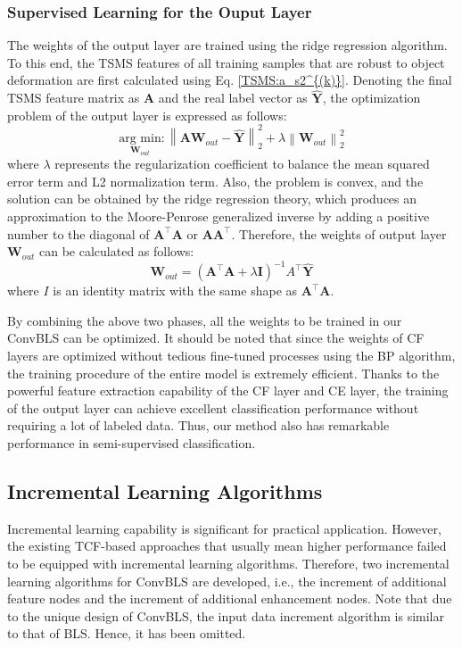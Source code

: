 \documentclass[lettersize,journal]{IEEEtran}
\begin{document}
\subsubsection{Supervised Learning for the Ouput Layer}
The weights of the output layer are trained using the ridge regression algorithm. To this end, the TSMS features of all training samples that are robust to object deformation are first calculated using Eq. \eqref{TSMS:a_s2^{(k)}}. Denoting the final TSMS feature matrix as $\bm{A}$ and the real label vector as $\hat{\bm{Y}}$, the optimization problem of the output layer is expressed as follows:
\begin{equation}
    \label{Problem_to_be_optimized}
    \underset {\bm{W}_{out}} {\text{arg min}}: \left \| \bm{AW}_{out} - \bm{\hat{Y}} \right \|_{2}^{2} + \lambda \left \| \bm{W}_{out} \right \|_{2}^{2} 
\end{equation}
where $\lambda$ represents the regularization coefficient to balance the mean squared error term and L2 normalization term. Also, the problem is convex, and the solution can be obtained by the ridge regression theory, which produces an approximation to the Moore-Penrose generalized inverse by adding a positive number to the diagonal of $\bm{A}^{\top}\bm{A}$ or $\bm{A}\bm{A}^{\top}$. Therefore, the weights of output layer $\bm{W}_{out}$ can be calculated as follows:
\begin{equation}
    \label{moore_pseudo_inverse}
    \bm{W}_{out}=(\bm{A}^{\top}\bm{A}+\lambda \bm{I})^{-1}A^{\top}\hat{\bm{Y}}
\end{equation}
where $I$ is an identity matrix with the same shape as $\bm{A}^{\top}\bm{A}$.

By combining the above two phases, all the weights to be trained in our ConvBLS can be optimized. It should be noted that since the weights of CF layers are optimized without tedious fine-tuned processes using the BP algorithm, the training procedure of the entire model is extremely efficient. Thanks to the powerful feature extraction capability of the CF layer and CE layer, the training of the output layer can achieve excellent classification performance without requiring a lot of labeled data. Thus, our method also has remarkable performance in semi-supervised classification.

\subsection{Incremental Learning Algorithms}
Incremental learning capability is significant for practical application. However, the existing TCF-based approaches that usually mean higher performance failed to be equipped with incremental learning algorithms. Therefore, two incremental learning algorithms for ConvBLS are developed, i.e., the increment of additional feature nodes and the increment of additional enhancement nodes. Note that due to the unique design of ConvBLS, the input data increment algorithm is similar to that of BLS. Hence, it has been omitted.
\end{document}
